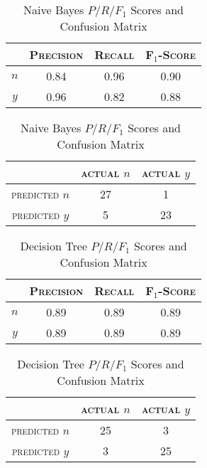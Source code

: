 \begin{table}[ht]
\begin{minipage}[b]{0.45\linewidth}\centering
\begin{tabular}{ c | c  c  c }
	& \textsc{Precision} & \textsc{Recall} & \textsc{F$_1$-Score} \\
	\hline
	\textsc{$n$} 	& 0.84   &   0.96   &   0.90 \\
	\textsc{$y$}	& 0.96   &   0.82   &   0.88
\end{tabular}
\end{minipage}
\hspace{0.5cm}
\begin{minipage}[b]{0.45\linewidth}
\centering
\begin{tabular}{ c | c  c }
	 & \textsc{actual $n$} & \textsc{actual $y$} \\
	\hline
	\textsc{predicted $n$} 	& 27 & 1 \\
	\textsc{predicted $y$}		& 5 & 23
\end{tabular}
\end{minipage}
\caption{Naive Bayes $P/R/F_1$ Scores and Confusion Matrix}
\end{table}

\begin{table}[ht]
\begin{minipage}[b]{0.45\linewidth}\centering
\begin{tabular}{ c | c  c  c }
	& \textsc{Precision} & \textsc{Recall} & \textsc{F$_1$-Score} \\
	\hline
	\textsc{$n$} 	& 0.89   &   0.89   &   0.89 \\
	\textsc{$y$}	& 0.89   &   0.89   &   0.89
\end{tabular}
\end{minipage}
\hspace{0.5cm}
\begin{minipage}[b]{0.45\linewidth}
\centering
\begin{tabular}{ c | c  c }
	 & \textsc{actual $n$} & \textsc{actual $y$} \\
	\hline
	\textsc{predicted $n$} 	& 25 & 3 \\
	\textsc{predicted $y$}		& 3 & 25
\end{tabular}
\end{minipage}
\caption{Decision Tree $P/R/F_1$ Scores and Confusion Matrix}
\end{table}
\newpage

